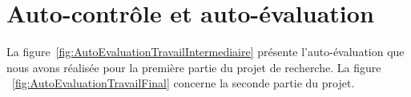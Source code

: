 \documentclass[11pt, french]{report-rd-info}
\begin{document}
\newpage
\printweeksummary
\chapter{Auto-contrôle et auto-évaluation}
La figure~\ref{fig:AutoEvaluationTravailIntermediaire} présente l'auto-évaluation que nous avons réalisée pour la première partie du projet de recherche. La figure ~\ref{fig:AutoEvaluationTravailFinal} concerne la seconde partie du projet.
\begin{figure}
	\centering
     \ifscreen %
     \else

\end{figure}
\end{document}
